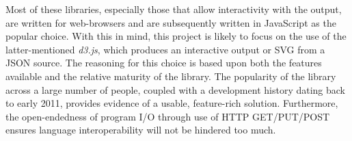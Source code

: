     
    \begin{remarks}
        Most of these libraries, especially those that allow interactivity with the output, are written for web-browsers and are subsequently written in JavaScript as the popular choice.
        With this in mind, this project is likely to focus on the use of the latter-mentioned \textit{d3.js}, which produces an interactive output or SVG from a JSON source.
        The reasoning for this choice is based upon both the features available and the relative maturity of the library.
        The popularity of the library across a large number of people, coupled with a development history dating back to early 2011, provides evidence of a usable, feature-rich solution.
        Furthermore, the open-endedness of program I/O through use of HTTP GET/PUT/POST ensures language interoperability will not be hindered too much.
    \end{remarks}
